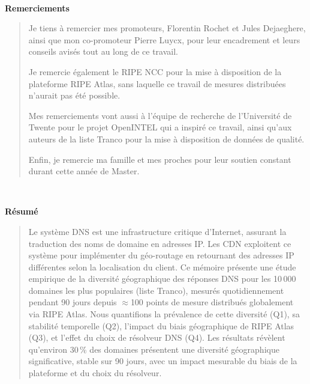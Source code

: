 \documentclass[a4paper,11pt]{book}
\begin{document}

\justifying
\pagestyle{empty}
\onehalfspacing

\clearpage\newpage\hbox{ }\clearpage\newpage

\noindent\textbf{\huge Remerciements}

\bigskip

\begin{quote}
Je tiens à remercier mes promoteurs, Florentin Rochet et Jules Dejaeghere, ainsi que mon co-promoteur Pierre Luycx, pour leur encadrement et leurs conseils avisés tout au long de ce travail.

Je remercie également le RIPE NCC pour la mise à disposition de la plateforme RIPE Atlas, sans laquelle ce travail de mesures distribuées n'aurait pas été possible.

Mes remerciements vont aussi à l'équipe de recherche de l'Université de Twente pour le projet OpenINTEL qui a inspiré ce travail, ainsi qu'aux auteurs de la liste Tranco pour la mise à disposition de données de qualité.

Enfin, je remercie ma famille et mes proches pour leur soutien constant durant cette année de Master.
\end{quote}

\clearpage\newpage\hbox{ }\clearpage\newpage

\noindent\textbf{\huge Résumé}
\bigskip

\begin{quote}
Le système DNS est une infrastructure critique d'Internet, assurant la traduction des noms de domaine en adresses IP. Les CDN exploitent ce système pour implémenter du géo-routage en retournant des adresses IP différentes selon la localisation du client. Ce mémoire présente une étude empirique de la diversité géographique des réponses DNS pour les 10\,000 domaines les plus populaires (liste Tranco), mesurés quotidiennement pendant 90 jours depuis $\approx$100 points de mesure distribués globalement via RIPE Atlas. Nous quantifions la prévalence de cette diversité (Q1), sa stabilité temporelle (Q2), l'impact du biais géographique de RIPE Atlas (Q3), et l'effet du choix de résolveur DNS (Q4). Les résultats révèlent qu'environ 30\,\% des domaines présentent une diversité géographique significative, stable sur 90 jours, avec un impact mesurable du biais de la plateforme et du choix du résolveur.
\end{quote}
\end{document}
